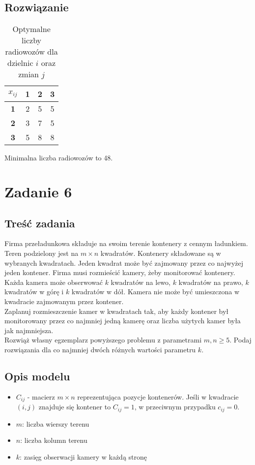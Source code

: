 \documentclass{article}
\begin{document}
\subsection{Rozwiązanie}
\begin{table}[H]
    \centering
    \begin{tabular}{|c||c|c|c|}
        \hline
        $x_{ij}$ & \textbf{1} & \textbf{2} & \textbf{3} \\
        \hline
        \hline
        \textbf{1} & 2 & 5 & 5 \\
        \hline
        \textbf{2} & 3 & 7 & 5 \\
        \hline
        \textbf{3} & 5 & 8 & 8 \\
        \hline
    \end{tabular}
    \label{tabela_wyniki5}
    \caption{Optymalne liczby radiowozów dla dzielnic $i$ oraz zmian $j$}
\end{table}
Minimalna liczba radiowozów to 48.
\section{Zadanie 6}
\subsection{Treść zadania}
Firma przeładunkowa składuje na swoim terenie kontenery z cennym ładunkiem. Teren podzielony jest na $m \times n$ kwadratów. Kontenery składowane są w wybranych kwadratach. Jeden kwadrat może być zajmowany przez co najwyżej jeden kontener. Firma musi rozmieścić kamery, żeby monitorować kontenery. Każda kamera może obserwować $k$ kwadratów na lewo, $k$ kwadratów na prawo, $k$ kwadratów w górę i $k$ kwadratów w dół. Kamera nie może być umieszczona w kwadracie zajmowanym przez kontener.\\
Zaplanuj rozmieszczenie kamer w kwadratach tak, aby każdy kontener był monitorowany przez co najmniej jedną kamerę oraz liczba użytych kamer była jak najmniejsza.\\
Rozwiąż własny egzemplarz powyższego problemu z parametrami $m, n \geq 5$. Podaj rozwiązania dla co najmniej dwóch różnych wartości parametru $k$.
\subsection{Opis modelu}
\begin{itemize}
    \item $C_{ij}$ - macierz $m \times n$ reprezentująca pozycje kontenerów. Jeśli w kwadracie $(i, j)$ znajduje się kontener to $C_{ij} = 1$, w przeciwnym przypadku $c_{ij} = 0$.
    \item $m$: liczba wierszy terenu
    \item $n$: liczba kolumn terenu
    \item $k$: zasięg obserwacji kamery w każdą stronę
\end{itemize}
\end{document}
